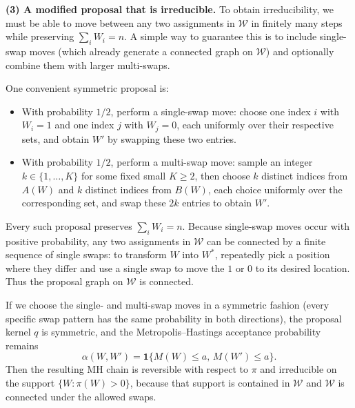\documentclass[answers,12pt,addpoints]{exam}
\begin{document}
\begin{questions}
\begin{solution}
\medskip

\textbf{(3) A modified proposal that is irreducible.}
To obtain irreducibility, we must be able to move between any two assignments in $\mathcal{W}$ in finitely many steps while preserving $\sum_i W_i = n$.
A simple way to guarantee this is to include single-swap moves (which already generate a connected graph on $\mathcal{W}$) and optionally combine them with larger multi-swaps.

One convenient symmetric proposal is:

\begin{itemize}
\item[(i)] With probability $1/2$, perform a single-swap move: choose one index $i$ with $W_i = 1$ and one index $j$ with $W_j = 0$, each uniformly over their respective sets, and obtain $W'$ by swapping these two entries.
\item[(ii)] With probability $1/2$, perform a multi-swap move: sample an integer $k \in \{1,\dots,K\}$ for some fixed small $K\ge 2$, then choose $k$ distinct indices from $A(W)$ and $k$ distinct indices from $B(W)$, each choice uniformly over the corresponding set, and swap these $2k$ entries to obtain $W'$.
\end{itemize}

Every such proposal preserves $\sum_i W_i = n$. Because single-swap moves occur with positive probability, any two assignments in $\mathcal{W}$ can be connected by a finite sequence of single swaps: to transform $W$ into $W^\ast$, repeatedly pick a position where they differ and use a single swap to move the $1$ or $0$ to its desired location. Thus the proposal graph on $\mathcal{W}$ is connected.

If we choose the single- and multi-swap moves in a symmetric fashion (every specific swap pattern has the same probability in both directions), the proposal kernel $q$ is symmetric, and the Metropolis--Hastings acceptance probability remains
\[
\alpha(W,W') = \mathbf{1}\{M(W)\le a,\,M(W')\le a\}.
\]
Then the resulting MH chain is reversible with respect to $\pi$ and irreducible on the support $\{W:\pi(W)>0\}$, because that support is contained in $\mathcal{W}$ and $\mathcal{W}$ is connected under the allowed swaps.
\end{solution}

\end{questions}
\end{document}
